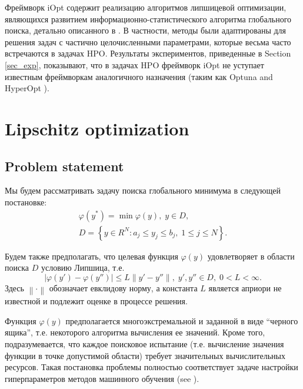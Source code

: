 \documentclass[preprint,12pt]{elsarticle}
\begin{document}
Фреймворк iOpt содержит реализацию алгоритмов липшицевой оптимизации, являющихся развитием информационно-статистического алгоритма глобального поиска, детально описанного в \cite{Strongin2000,Sergeyev2013}. 
В частности, методы были адаптированы для решения задач с частично целочисленными параметрами, которые весьма часто встречаются в задачах HPO.
Результаты экспериментов, приведенные в Section \ref{sec_exp}, показывают, что в задачах HPO фреймворк iOpt не уступает известным фреймворкам аналогичного назначения (таким как Optuna \cite{optuna} and HyperOpt \cite{hyperopt}).

\section{Lipschitz optimization} 
\label{sec_lip}

\subsection{Problem statement} 

Мы будем рассматривать задачу поиска глобального минимума в следующей постановке:
\begin{gather}
	\varphi(y^*) = \min \varphi(y), \; y \in D, \label{f_func} \\
	D = \left\{y \in R^N : a_j \leq y_j \leq b_j , \; 1 \leq j \leq N \right\}. \label{f_D}
\end{gather}

Будем также предполагать, что целевая функция $\varphi(y)$ удовлетворяет в области поиска $D$ условию Липшица, т.е.
\begin{equation} \label{f_lip}
	\left| \varphi(y')-\varphi(y'') \right| \leq L\left\| y' - y''  \right\| , \; y',y'' \in D, \; 0<L<\infty.
\end{equation}
Здесь $ \left\| \cdot \right\|$ обозначает евклидову норму, а константа $L$ является априори не известной и подлежит оценке в процессе решения. 

Функция $\varphi(y)$ предполагается многоэкстремальной и заданной в виде ``черного ящика'', т.е. некоторого алгоритма вычисления ее значений. Кроме того, подразумевается, что каждое поисковое испытание (т.е. вычисление значения функции в точке допустимой области) требует значительных вычислительных ресурсов. Такая постановка проблемы полностью соответствует задаче настройки гиперпараметров методов машинного обучения (see ).
\end{document}
